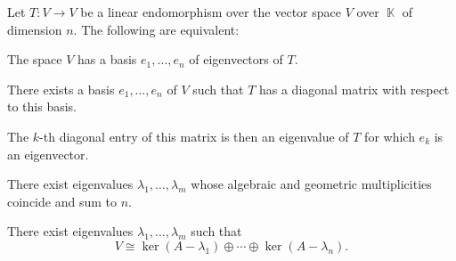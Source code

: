 \begin{proposition}\label{thm:operator_diagonalizability}
  Let \( T: V \to V \) be a linear endomorphism over the vector space \( V \) over \( \BbbK \) of dimension \( n \). The following are equivalent:
  \begin{thmenum}
     The space \( V \) has a basis \( e_1, \ldots, e_n \) of eigenvectors of \( T \).

     There exists a basis \( e_1, \ldots, e_n \) of \( V \) such that \( T \) has a diagonal matrix with respect to this basis.

    The \( k \)-th diagonal entry of this matrix is then an eigenvalue of \( T \) for which \( e_k \) is an eigenvector.

     There exist eigenvalues \( \lambda_1, \ldots, \lambda_m \) whose algebraic and geometric multiplicities coincide and sum to \( n \).

     There exist eigenvalues \( \lambda_1, \ldots, \lambda_m \) such that
    \begin{equation*}
      V \cong \ker(A - \lambda_1) \oplus \cdots \oplus \ker(A - \lambda_n).
    \end{equation*}
  \end{thmenum}
\end{proposition}
